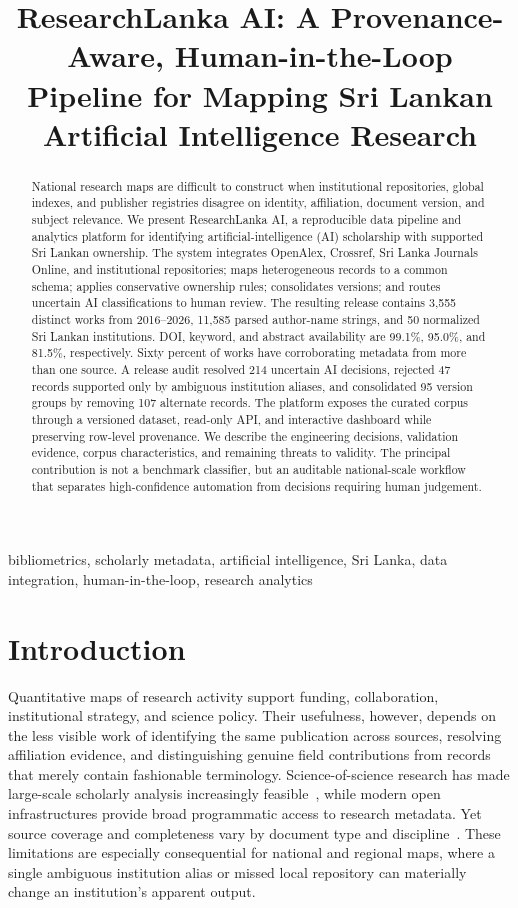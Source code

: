 \documentclass[conference]{IEEEtran}
\title{ResearchLanka AI: A Provenance-Aware, Human-in-the-Loop Pipeline for Mapping Sri Lankan Artificial Intelligence Research}
\author{\IEEEauthorblockN{Anusank Krishnathas}
\IEEEauthorblockA{ResearchLanka AI Project, Sri Lanka\\
\url{https://github.com/krish-anu/researchlanka-ai}}}
\begin{document}
\maketitle

\begin{abstract}
National research maps are difficult to construct when institutional repositories, global indexes, and publisher registries disagree on identity, affiliation, document version, and subject relevance. We present ResearchLanka AI, a reproducible data pipeline and analytics platform for identifying artificial-intelligence (AI) scholarship with supported Sri Lankan ownership. The system integrates OpenAlex, Crossref, Sri Lanka Journals Online, and institutional repositories; maps heterogeneous records to a common schema; applies conservative ownership rules; consolidates versions; and routes uncertain AI classifications to human review. The resulting release contains 3,555 distinct works from 2016--2026, 11,585 parsed author-name strings, and 50 normalized Sri Lankan institutions. DOI, keyword, and abstract availability are 99.1\%, 95.0\%, and 81.5\%, respectively. Sixty percent of works have corroborating metadata from more than one source. A release audit resolved 214 uncertain AI decisions, rejected 47 records supported only by ambiguous institution aliases, and consolidated 95 version groups by removing 107 alternate records. The platform exposes the curated corpus through a versioned dataset, read-only API, and interactive dashboard while preserving row-level provenance. We describe the engineering decisions, validation evidence, corpus characteristics, and remaining threats to validity. The principal contribution is not a benchmark classifier, but an auditable national-scale workflow that separates high-confidence automation from decisions requiring human judgement.
\end{abstract}

\begin{IEEEkeywords}
bibliometrics, scholarly metadata, artificial intelligence, Sri Lanka, data integration, human-in-the-loop, research analytics
\end{IEEEkeywords}

\section{Introduction}
Quantitative maps of research activity support funding, collaboration, institutional strategy, and science policy. Their usefulness, however, depends on the less visible work of identifying the same publication across sources, resolving affiliation evidence, and distinguishing genuine field contributions from records that merely contain fashionable terminology. Science-of-science research has made large-scale scholarly analysis increasingly feasible~\cite{fortunato2018science}, while modern open infrastructures provide broad programmatic access to research metadata. Yet source coverage and completeness vary by document type and discipline~\cite{visser2021comparison}. These limitations are especially consequential for national and regional maps, where a single ambiguous institution alias or missed local repository can materially change an institution's apparent output.
\end{document}
